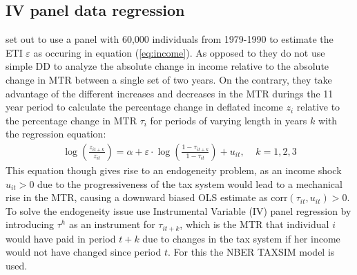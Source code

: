 \subsection{IV panel data regression}
\citet{gruber2002elasticity} set out to use a panel with 60,000 individuals from 1979-1990 to estimate the ETI $\varepsilon$ as occuring in equation (\ref{eq:income}). As opposed to \citet{feldstein1995effect} they do not use simple DD to analyze the absolute change in income relative to the absolute change in MTR between a single set of two years. On the contrary, they take advantage of the different increases and decreases in the MTR durings the 11 year period to calculate the percentage change in deflated income $z_i$ relative to the percentage change in MTR $\tau_i$ for periods of varying length in years $k$ with the regression equation:
\begin{align}
  \log\left(\frac{z_{it+k}}{z_{it}}\right)=\alpha +\varepsilon\cdot \log\left(\frac{1-\tau_{it+k}}{1-\tau_{it}}\right) + u_{it},\ \ \ \ \ k=1,2,3
  \label{eq:income_est}
\end{align}
This equation though gives rise to an endogeneity problem, as an income shock $u_{it}>0$ due to the progressiveness of the tax system would lead to a mechanical rise in the MTR, causing a downward biased OLS estimate as corr$(\tau_{it},u_{it})>0$. To solve the endogeneity issue \citet{gruber2002elasticity} use Instrumental Variable (IV) panel regression by introducing $\tau^h$ as an instrument for $\tau_{it+k}$, which is the MTR that individual $i$ would have paid in period $t+k$ due to changes in the tax system if her income would not have changed since period $t$. For this the NBER TAXSIM model is used.


